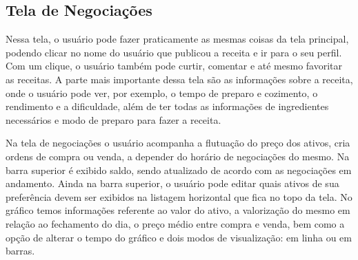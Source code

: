 \subsection{Tela de Negociações}
Nessa tela, o usuário pode fazer praticamente as mesmas coisas da tela principal, podendo clicar no nome do usuário que publicou a receita e ir para o seu perfil. Com um clique, o usuário também pode curtir, comentar e até mesmo favoritar as receitas. A parte mais importante dessa tela são as informações sobre a receita, onde o usuário pode ver, por exemplo, o tempo de preparo e cozimento, o rendimento e a dificuldade, além de ter todas as informações de ingredientes necessários e modo de preparo para fazer a receita.

Na tela de negociações o usuário acompanha a flutuação do preço dos ativos, cria ordens de compra ou venda, a depender do horário de negociações do mesmo. Na barra superior é exibido saldo, sendo atualizado de acordo com as negociações em andamento. Ainda na barra superior, o usuário pode editar quais ativos de sua preferência devem ser exibidos na listagem horizontal que fica no topo da tela.
No gráfico temos informações referente ao valor do ativo, a valorização do mesmo em relação ao fechamento do dia, o preço médio entre compra e venda, bem como a opção de alterar o tempo do gráfico e dois modos de visualização: em linha ou em barras.

